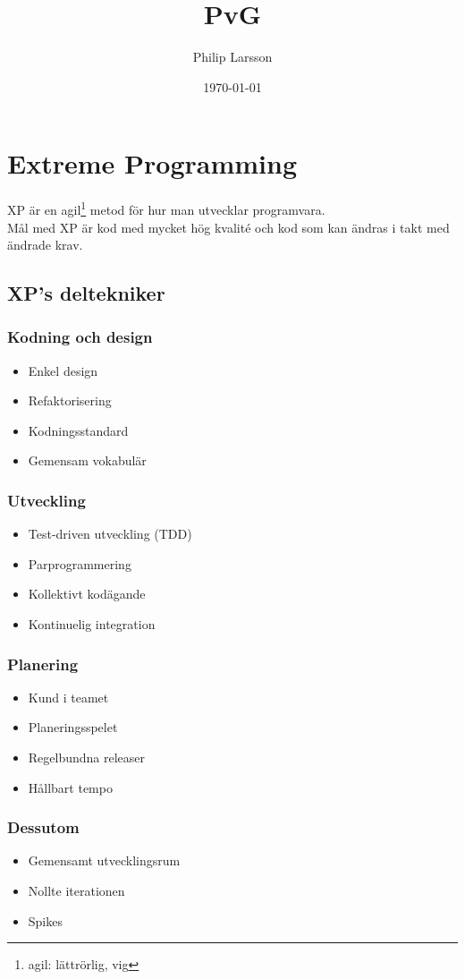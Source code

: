 \documentclass[a4paper]{article}
\title{PvG}
\author{Philip Larsson}
\date{\today}
\begin{document}
\maketitle


\tableofcontents
\newpage


\section{Extreme Programming}
XP är en agil\footnote{agil: lättrörlig, vig} metod för hur man utvecklar programvara. \\
Mål med XP är kod med mycket hög kvalité och kod som kan ändras i takt med ändrade krav. 
\subsection{XP's deltekniker}
\subsubsection*{Kodning och design}
\begin{itemize}
\item{Enkel design}
\item{Refaktorisering}
\item{Kodningsstandard}
\item{Gemensam vokabulär}
\end{itemize}
\subsubsection*{Utveckling}
\begin{itemize}
\item{Test-driven utveckling (TDD)}
\item{Parprogrammering}
\item{Kollektivt kodägande}
\item{Kontinuelig integration}
\end{itemize}
\subsubsection*{Planering}
\begin{itemize}
\item{Kund i teamet}
\item{Planeringsspelet}
\item{Regelbundna releaser}
\item{Hållbart tempo}
\end{itemize}
\subsubsection*{Dessutom}
\begin{itemize}
\item{Gemensamt utvecklingsrum}
\item{Nollte iterationen}
\item{Spikes}
\end{itemize}
\end{document}
